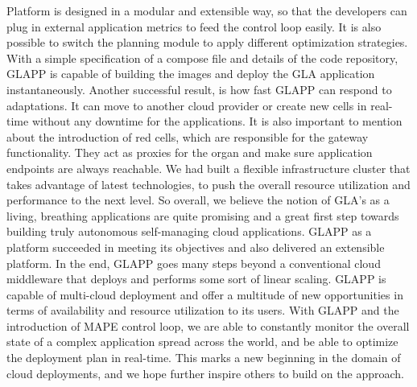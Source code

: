 \documentclass{seal_thesis}
\begin{document}
Platform is designed in a modular and extensible way, so that the developers can plug in external application metrics to feed the control loop easily. 
It is also possible to switch the planning module to apply different optimization strategies. 
With a simple specification of a compose file and details of the code repository, GLAPP is capable of building the images and deploy the GLA application instantaneously. 
Another successful result, is how fast GLAPP can respond to adaptations. 
It can move to another cloud provider or create new cells in real-time without any downtime for the applications. 
It is also important to mention about the introduction of red cells, which are responsible for the gateway functionality. 
They act as proxies for the organ and make sure application endpoints are always reachable. 
We had built a flexible infrastructure cluster that takes advantage of latest technologies, to push the overall resource utilization and performance to the next level. 
So overall, we believe the notion of GLA's as a living, breathing applications are quite promising and a great first step towards building truly autonomous self-managing cloud applications. 
GLAPP as a platform succeeded in meeting its objectives and also delivered an extensible platform. 
In the end, GLAPP goes many steps beyond a conventional cloud middleware that deploys and performs some sort of linear scaling. 
GLAPP is capable of multi-cloud deployment and offer a multitude of new opportunities in terms of availability and resource utilization to its users. 
With GLAPP and the introduction of MAPE control loop, we are able to constantly monitor the overall state of a complex application spread across the world, and be able to optimize the deployment plan in real-time. 
This marks a new beginning in the domain of cloud deployments, and we hope further inspire others to build on the approach.






\end{document}
